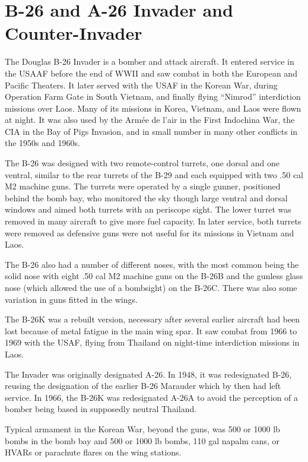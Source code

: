 \section*{B-26 and A-26 Invader and Counter-Invader}

The Douglas B-26 Invader is a bomber and attack aircraft. It entered service in the USAAF before the end of WWII and saw combat in both the European and  Pacific Theaters. It later served with the USAF in the Korean War, during Operation Farm Gate in South Vietnam, and finally flying “Nimrod” interdiction missions over Laos. Many of its missions in Korea, Vietnam, and Laos were flown at night. It was also used by the Armée de l'air in the First Indochina War, the CIA in the Bay of Pigs Invasion, and in small number in many other conflicts in the 1950s and 1960s.

The B-26 was designed with two remote-control turrets, one dorsal and one ventral, similar to the rear turrets of the B-29 and each equipped with two .50 cal M2 machine guns. The turrets were operated by a single gunner, positioned behind the bomb bay, who monitored the sky though large ventral and dorsal windows and aimed both turrets with an periscope sight. The lower turret was removed in many aircraft to give more fuel capacity. In later service, both turrets were removed as defensive guns were not useful for its missions in Vietnam and Laos. 

The B-26 also had a number of different noses, with the most common being the solid nose with eight .50 cal M2 machine guns on the B-26B and the gunless glass nose (which allowed the use of a bombsight) on the B-26C. There was also some variation in guns fitted in the wings.

The B-26K was a rebuilt version, necessary after several earlier aircraft had been lost because of metal fatigue in the main wing spar. It saw combat from 1966 to 1969 with the USAF, flying from Thailand on night-time interdiction missions in Laos. 

The Invader was originally designated A-26. In 1948, it was redesignated B-26, reusing the designation of the earlier B-26 Marauder which by then had left service. In 1966, the B-26K was redesignated A-26A to avoid the perception of a bomber being based in supposedly neutral Thailand.

Typical armament in the Korean War, beyond the guns, was 500 or 1000 lb bombs in the bomb bay and 500 or 1000 lb bombs, 110 gal napalm cans, or HVARs or parachute flares on the wing stations.

